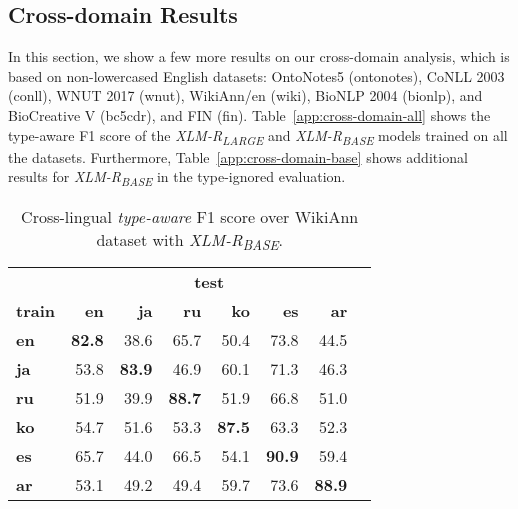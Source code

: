\documentclass[11pt,a4paper]{article}
\begin{document}
\subsection{Cross-domain Results}
In this section, we show a few more results on our cross-domain analysis, which is based on non-lowercased English datasets: OntoNotes5 (ontonotes), CoNLL 2003 (conll), WNUT 2017 (wnut), WikiAnn/en (wiki), BioNLP 2004 (bionlp), and BioCreative V (bc5cdr), and FIN (fin).
Table~\ref{app:cross-domain-all} shows the type-aware F1 score of the {\it XLM-R\textsubscript{LARGE}} and {\it XLM-R\textsubscript{BASE}} models trained on all the datasets. Furthermore, Table~\ref{app:cross-domain-base} shows additional results for {\it XLM-R\textsubscript{BASE}} in the type-ignored evaluation.
 


\begin{table}[ht]
\centering
\begin{tabular}{l|rrrrrrr}
\hline
& \multicolumn{6}{c}{\textbf{test}} \\
\textbf{train} & \textbf{en}   & \textbf{ja}   & \textbf{ru}   & \textbf{ko}   & \textbf{es}   & \textbf{ar}    \\\hline
\textbf{en}    & \textbf{82.8} & 38.6          & 65.7          & 50.4          & 73.8          & 44.5           \\\hline
\textbf{ja}    & 53.8          & \textbf{83.9} & 46.9          & 60.1          & 71.3          & 46.3           \\\hline
\textbf{ru}    & 51.9          & 39.9          & \textbf{88.7} & 51.9          & 66.8          & 51.0           \\\hline
\textbf{ko}    & 54.7          & 51.6          & 53.3          & \textbf{87.5} & 63.3          & 52.3           \\\hline
\textbf{es}    & 65.7          & 44.0          & 66.5          & 54.1          & \textbf{90.9} & 59.4           \\\hline
\textbf{ar}    & 53.1          & 49.2          & 49.4          & 59.7          & 73.6          & \textbf{88.9}  \\\hline
\end{tabular}
\caption{\label{app:cross-lingual-base}
Cross-lingual \textit{type-aware} F1 score over WikiAnn dataset with {\it XLM-R\textsubscript{BASE}}.}
\end{table}
\end{document}
